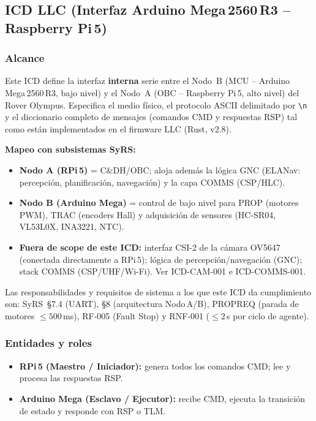 
\subsection{ICD LLC (Interfaz Arduino Mega\,2560\,R3 -- Raspberry Pi\,5)}
\label{sec:icd_llc}

\subsubsection{Alcance}
Este ICD define la interfaz \textbf{interna} serie entre el Nodo~B
(MCU -- Arduino Mega\,2560\,R3, bajo nivel) y el Nodo~A
(OBC -- Raspberry Pi\,5, alto nivel) del Rover Olympus.
Especifica el medio físico, el protocolo ASCII delimitado por
\verb|\n| y el diccionario completo de mensajes
(comandos CMD y respuestas RSP) tal como están implementados
en el firmware LLC (Rust, v2.8).

\textbf{Mapeo con subsistemas SyRS:}
\begin{itemize}
  \item \textbf{Nodo A (RPi\,5)} = C\&DH/OBC; aloja además la lógica GNC
        (ELANav: percepción, planificación, navegación) y la capa COMMS (CSP/HLC).
  \item \textbf{Nodo B (Arduino Mega)} = control de bajo nivel para PROP
        (motores PWM), TRAC (encoders Hall) y adquisición de sensores
        (HC-SR04, VL53L0X, INA3221, NTC).
  \item \textbf{Fuera de scope de este ICD:} interfaz CSI-2 de la cámara
        OV5647 (conectada directamente a RPi\,5); lógica de percepción/navegación
        (GNC); stack COMMS (CSP/UHF/Wi-Fi). Ver ICD-CAM-001 e ICD-COMMS-001.
\end{itemize}

Las responsabilidades y requisitos de sistema a los que este ICD da
cumplimiento son: SyRS~§7.4 (UART), §8 (arquitectura Nodo\,A/B),
PROP\-REQ (parada de motores $\leq 500$\,ms),
RF‑005 (Fault Stop) y RNF‑001 ($\leq 2$\,s por ciclo de agente).

\subsubsection{Entidades y roles}
\begin{itemize}
  \item \textbf{RPi\,5 (Maestro / Iniciador):}
        genera todos los comandos CMD; lee y procesa las respuestas RSP.
  \item \textbf{Arduino Mega (Esclavo / Ejecutor):}
        recibe CMD, ejecuta la transición de estado y responde
        con RSP o TLM.
\end{itemize}

